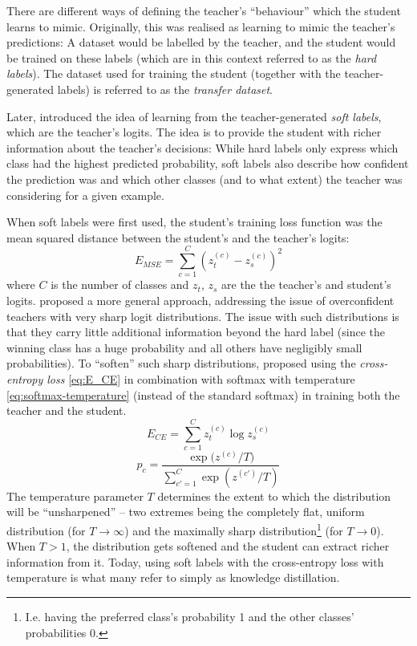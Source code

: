 \documentclass[bsc,frontabs,twoside,singlespacing,parskip,deptreport]{infthesis}
\begin{document}
{{{      There are different ways of defining the teacher's ``behaviour'' which the student learns to mimic. Originally, this was realised as learning to mimic the teacher's predictions: A dataset would be labelled by the teacher, and the student would be trained on these labels (which are in this context referred to as the \textit{hard labels}). The dataset used for training the student (together with the teacher-generated labels) is referred to as the \textit{transfer dataset}.

      Later, \citet{Ba_2013} introduced the idea of learning from the teacher-generated \textit{soft labels}, which are the teacher's logits. The idea is to provide the student with richer information about the teacher's decisions: While hard labels only express which class had the highest predicted probability, soft labels also describe how confident the prediction was and which other classes (and to what extent) the teacher was considering for a given example.

      When soft labels were first used, the student's training loss function was the mean squared distance between the student's and the teacher's logits:
      \begin{equation}
        E_{MSE}=\sum_{c=1}^{C}{(z_t^{(c)}-z_s^{(c)})^2}
        \label{eq:E_MSE}        
      \end{equation}
      where $C$ is the number of classes and $z_t$, $z_s$ are the the teacher's and student's logits.
      \citet{Hinton_2015} proposed a more general approach, addressing the issue of overconfident teachers with very sharp logit distributions. The issue with such distributions is that they carry little additional information beyond the hard label (since the winning class has a huge probability and all others have negligibly small probabilities).
      To ``soften'' such sharp distributions, \citeauthor{Hinton_2015} proposed using the \textit{cross-entropy loss} \autoref{eq:E_CE} in combination with softmax with temperature \autoref{eq:softmax-temperature} (instead of the standard softmax) in training both the teacher and the student.
      \begin{equation}
        E_{CE}=\sum_{c=1}^{C}{z_t^{(c)} \log{z_s^{(c)}}}
        \label{eq:E_CE}        
      \end{equation}
      \begin{equation}
        p_c=\frac{\exp{(z^{(c)}/T})}{\sum_{c'=1}^{C}{\exp{(z^{(c')}/T)}}}
        \label{eq:softmax-temperature}        
      \end{equation}
      The temperature parameter $T$ determines the extent to which the distribution will be ``unsharpened'' -- two extremes being the completely flat, uniform distribution (for $T \rightarrow \infty$) and the maximally sharp distribution\footnote{I.e. having the preferred class's probability 1 and the other classes' probabilities 0.} (for $T \rightarrow 0$). When $T > 1$, the distribution gets softened and the student can extract richer information from it. Today, using soft labels with the cross-entropy loss with temperature is what many refer to simply as knowledge distillation.

}}}
\end{document}
